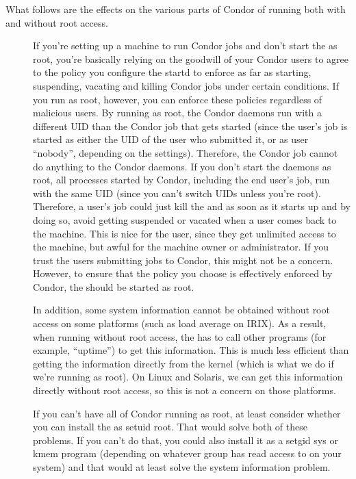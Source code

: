 What follows are the effects on the various parts of Condor
of running both with and without root access.

\begin{description}

\item[] If you're setting up a machine to run Condor
   jobs and don't start the  as root, you're basically
   relying on the goodwill of your Condor users to agree to the policy
   you configure the startd to enforce as far as starting, suspending,
   vacating and killing Condor jobs under certain conditions.  If you
   run as root, however, you can enforce these policies regardless of
   malicious users.  By running as root, the Condor daemons run with a
   different UID than the Condor job that gets started (since the
   user's job is started as either the UID of the user who submitted
   it, or as user ``nobody'', depending on the 
   settings).  Therefore, the Condor job cannot do anything to the
   Condor daemons.  If you don't start the daemons as root, all
   processes started by Condor, including the end user's job, run with
   the same UID (since you can't switch UIDs unless you're root).
   Therefore, a user's job could just kill the  and
    as soon as it starts up and by doing so, avoid
   getting suspended or vacated when a user comes back to the machine.
   This is nice for the user, since they get unlimited access to the
   machine, but awful for the machine owner or administrator.  If you
   trust the users submitting jobs to Condor, this might not be a
   concern.  However, to ensure that the policy you choose is
   effectively enforced by Condor, the  should be
   started as root.

   In addition, some system information cannot be obtained without
   root access on some platforms (such as load average on IRIX).  As a
   result, when running without root access, the  has to
   call other programs (for example, ``uptime'') to get this
   information.  This is much less efficient than getting the
   information directly from the kernel (which is what we do if we're
   running as root).  On Linux and Solaris, we can get this
   information directly without root access, so this is not a concern
   on those platforms.

   If you can't have all of Condor running as root, at least consider
   whether you can install the  as setuid root.  That
   would solve both of these problems.  If you can't do that, you
   could also install it as a setgid sys or kmem program (depending on
   whatever group has read access to  on your system)
   and that would at least solve the system information problem.


\end{description}
